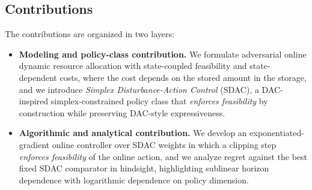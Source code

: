 \documentclass[11pt]{article}
\begin{document}



\subsection{Contributions}
The contributions are organized in two layers:
\begin{itemize}
    \item \textbf{Modeling and policy-class contribution.} We formulate adversarial online dynamic resource allocation with state-coupled feasibility and state-dependent costs, where the cost depends on the stored amount in the storage, and we introduce \emph{Simplex Disturbance-Action Control} (SDAC), a DAC-inspired simplex-constrained policy class that \emph{enforces feasibility} by construction while preserving DAC-style expressiveness.
    \item \textbf{Algorithmic and analytical contribution.} We develop an exponentiated-gradient online controller over SDAC weights in which a clipping step \emph{enforces  feasibility} of the online action, and we analyze regret against the best fixed SDAC comparator in hindsight, highlighting sublinear horizon dependence with logarithmic dependence on policy dimension.
\end{itemize}
\end{document}
